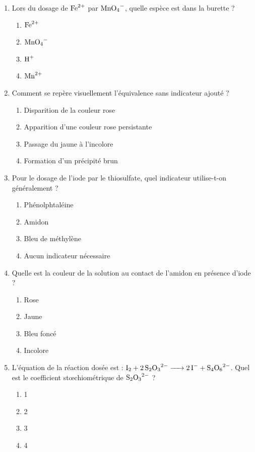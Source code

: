 \documentclass[11pt]{article}
\begin{document}
\begin{exercice}
\begin{enumerate}
    \item Lors du dosage de $\ce{Fe^{2+}}$ par $\ce{MnO4-}$, quelle espèce est dans la burette ?
    \begin{enumerate}
        \item $\ce{Fe^{2+}}$ \item $\ce{MnO4-}$ \item $\ce{H+}$ \item $\ce{Mn^{2+}}$
    \end{enumerate}
    \item Comment se repère visuellement l'équivalence sans indicateur ajouté ?
    \begin{enumerate}
        \item Disparition de la couleur rose \item Apparition d'une couleur rose persistante \item Passage du jaune à l'incolore \item Formation d'un précipité brun
    \end{enumerate}
    \item Pour le dosage de l'iode par le thiosulfate, quel indicateur utilise-t-on généralement ?
    \begin{enumerate}
        \item Phénolphtaléine \item Amidon \item Bleu de méthylène \item Aucun indicateur nécessaire
    \end{enumerate}
    \item Quelle est la couleur de la solution au contact de l'amidon en présence d'iode ?
    \begin{enumerate}
        \item Rose \item Jaune \item Bleu foncé \item Incolore
    \end{enumerate}
    \item L'équation de la réaction dosée est : $\ce{I2 + 2 S2O3^{2-} -> 2 I- + S4O6^{2-}}$. Quel est le coefficient stœchiométrique de $\ce{S2O3^{2-}}$ ?
    \begin{enumerate}
        \item 1 \item 2 \item 3 \item 4
    \end{enumerate}
\end{enumerate}
\end{exercice}
\end{document}
